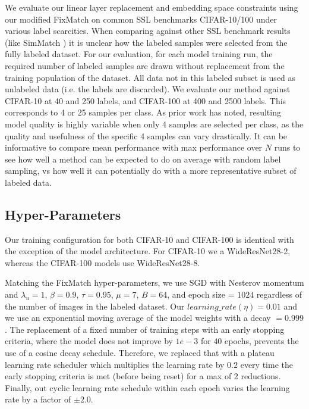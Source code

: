 \documentclass[10pt,twocolumn,letterpaper]{article}
\begin{document}
We evaluate our linear layer replacement and embedding space constraints using our modified FixMatch on common SSL benchmarks CIFAR-10/100 \cite{cifar10} under various label scarcities. 
When comparing against other SSL benchmark results (like SimMatch \cite{zheng2022simmatch}) it is unclear how the labeled samples were selected from the fully labeled dataset. 
For our evaluation, for each model training run, the required number of labeled samples are drawn without replacement from the training population of the dataset.
All data not in this labeled subset is used as unlabeled data (i.e. the labels are discarded).
We evaluate our method against CIFAR-10 at 40 and 250 labels, and CIFAR-100 at 400 and 2500 labels. 
This corresponds to 4 or 25 samples per class.
As prior work \cite{sohn2020fixmatch} has noted, resulting model quality is highly variable when only 4 samples are selected per class, as the quality and usefulness of the specific 4 samples can vary drastically. 
It can be informative to compare mean performance with max performance over $N$ runs to see how well a method can be expected to do on average with random label sampling, vs how well it can potentially do with a more representative subset of labeled data.

\subsection{Hyper-Parameters}

Our training configuration for both CIFAR-10 and CIFAR-100 is identical with the exception of the model architecture.
For CIFAR-10 we a WideResNet28-2, whereas the CIFAR-100 models use WideResNet28-8.

Matching the FixMatch \cite{sohn2020fixmatch} hyper-parameters, we use SGD with Nesterov momentum and $\lambda_u = 1$, $\beta = 0.9$, $\tau = 0.95$, $\mu = 7$, $B = 64$, and epoch size = $1024$ regardless of the number of images in the labeled dataset.
Our $learning\_rate (\eta) = 0.01$ and we use an exponential moving average of the model weights with a decay $=0.999$.
The replacement of a fixed number of training steps with an early stopping criteria, where the model does not improve by $1e-3$ for $40$ epochs, prevents the use of a cosine decay schedule.
Therefore, we replaced that with a plateau learning rate scheduler which multiplies the learning rate by $0.2$ every time the early stopping criteria is met (before being reset) for a max of 2 reductions.
Finally, out cyclic learning rate schedule within each epoch varies the learning rate by a factor of $\pm2.0$.
\end{document}
